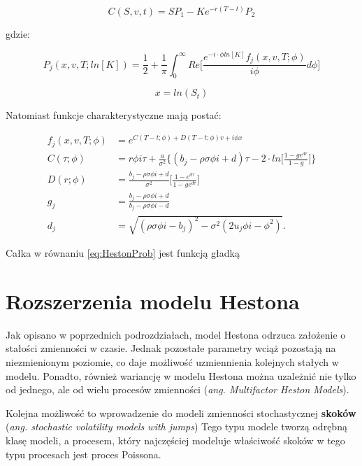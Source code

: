 \documentclass{pracamgr}
\begin{document}
\begin{equation}
  C(S, v, t) = SP_1 -K e^{-r(T-t)} P_2
\end{equation}

gdzie:

\begin{equation}
\label{eq:HestonProb}
  P_j (x, v, T; ln[K]) = \frac{1}{2} + \frac{1}{\pi} \int_{0}^{\infty} Re \bigg[ \frac{e^{-i \cdot \phi ln[K]} f_j(x, v, T; \phi) }{i \phi} d \phi \bigg]
\end{equation}

\begin{equation}
  x = ln(S_t)
\end{equation}

Natomiast funkcje charakterystyczne mają postać: 

\begin{equation}
  \begin{aligned}
f_j(x, v, T; \phi) &= e^{C(T-t; \phi) + D(T-t; \phi)v + i \phi x} \\
C (\tau; \phi)     &= r \phi i \tau + \frac{a}{\sigma^2} \bigg\{ (b_j - \rho \sigma \phi i + d) \tau - 2 \cdot ln \bigg[ \frac{1 - ge^{dr}}{1-g} \bigg] \bigg\} \\
D (r; \phi)        &= \frac{b_j- \rho \sigma \phi i + d}{\sigma^2} \bigg[ \frac{1 - e^{d\tau}}{1 - ge^{d\tau}} \bigg]   \\
g_j                &= \frac{b_j - \rho \sigma \phi i + d}{b_j - \rho \sigma \phi i - d} \\
d_j                &= \sqrt{(\rho \sigma \phi i  - b_j)^2 - \sigma^2(2 u_j \phi  i  - \phi^2)}.
  \end{aligned}
\end{equation}

Całka w równaniu \ref{eq:HestonProb} jest funkcją gładką 


\section{Rozszerzenia modelu Hestona}

Jak opisano w poprzednich podrozdziałach, model Hestona odrzuca założenie o stałości zmienności w czasie. 
Jednak pozostałe parametry wciąż pozostają na niezmienionym poziomie, co daje możliwość uzmiennienia
kolejnych stałych w modelu.
Ponadto, również wariancję w modelu Hestona można uzależnić nie tylko 
od jednego, ale od wielu procesów zmienności (\textit{ang. Multifactor Heston Models}).

Kolejna możliwość to wprowadzenie do modeli zmienności stochastycznej \textbf{skoków} (\textit{ang. stochastic volatility models with jumps})
Tego typu modele tworzą odrębną klasę modeli, a procesem, który najczęściej modeluje właściwość
skoków w tego typu procesach jest proces Poissona.
\end{document}
